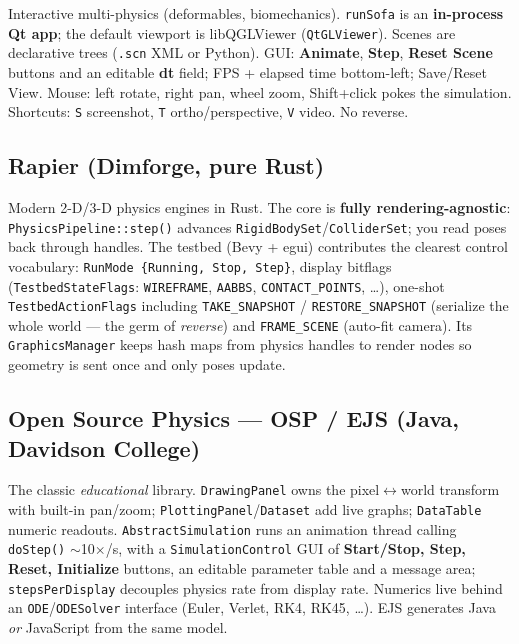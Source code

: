 \documentclass[11pt]{article}
\newcommand{\code}[1]{\texttt{#1}}
\begin{document}
Interactive multi-physics (deformables, biomechanics). \code{runSofa}
is an \textbf{in-process Qt app}; the default viewport is
libQGLViewer (\code{QtGLViewer}). Scenes are declarative trees
(\code{.scn} XML or Python). GUI: \textbf{Animate}, \textbf{Step},
\textbf{Reset Scene} buttons and an editable \textbf{dt} field; FPS +
elapsed time bottom-left; Save/Reset View. Mouse: left rotate, right
pan, wheel zoom, Shift+click pokes the simulation. Shortcuts:
\code{S} screenshot, \code{T} ortho/perspective, \code{V} video. No
reverse.

\subsection{Rapier (Dimforge, pure Rust)}

Modern 2-D/3-D physics engines in Rust. The core is \textbf{fully
rendering-agnostic}: \code{PhysicsPipeline::step()} advances
\code{RigidBodySet}/\code{ColliderSet}; you read poses back through
handles. The testbed (Bevy + egui) contributes the clearest control
vocabulary: \code{RunMode \{Running, Stop, Step\}}, display bitflags
(\code{TestbedStateFlags}: \code{WIREFRAME}, \code{AABBS},
\code{CONTACT\_POINTS}, \ldots), one-shot \code{TestbedActionFlags}
including \code{TAKE\_SNAPSHOT} / \code{RESTORE\_SNAPSHOT} (serialize
the whole world --- the germ of \emph{reverse}) and
\code{FRAME\_SCENE} (auto-fit camera). Its \code{GraphicsManager}
keeps hash maps from physics handles to render nodes so geometry is
sent once and only poses update.

\subsection{Open Source Physics --- OSP / EJS (Java, Davidson College)}

The classic \emph{educational} library. \code{DrawingPanel} owns the
pixel$\leftrightarrow$world transform with built-in pan/zoom;
\code{PlottingPanel}/\code{Dataset} add live graphs; \code{DataTable}
numeric readouts. \code{AbstractSimulation} runs an animation thread
calling \code{doStep()} $\sim$10$\times$/s, with a
\code{SimulationControl} GUI of \textbf{Start/Stop, Step, Reset,
Initialize} buttons, an editable parameter table and a message area;
\code{stepsPerDisplay} decouples physics rate from display rate.
Numerics live behind an \code{ODE}/\code{ODESolver} interface (Euler,
Verlet, RK4, RK45, \ldots). EJS generates Java \emph{or} JavaScript
from the same model.
\end{document}
